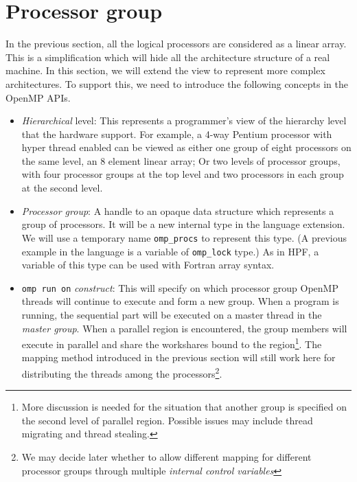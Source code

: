 
\section{Processor group}

In the previous section, all the logical processors are considered as a linear
array. This is a simplification which will hide all the architecture
structure of a real machine. In this section, we will extend the view to
represent more complex architectures. To support this, we need to introduce the
following concepts in the OpenMP APIs.

\begin{itemize}

  \item \emph{Hierarchical} level: This represents a programmer's view of the
    hierarchy level that the hardware support. For example, a 4-way Pentium
    processor with hyper thread enabled can be viewed as either one group of
    eight processors on the same level, an 8 element linear array; Or two
    levels of processor groups, with four processor groups at the top level and
    two processors in each group at the second level.

  \item \emph{Processor group}: A handle to an opaque data structure which
    represents a group of processors. It will be a new internal type in the
    language extension. We will use a temporary name \texttt{omp\_procs}
    to represent this type. (A previous example in the language is a variable of
    \texttt{omp\_lock} type.) As in HPF\cite{Koe93}, a variable of this
    type can be used with Fortran array syntax.

  \item \texttt{omp run on} \emph{construct}: This will specify on which
    processor group OpenMP threads will continue to execute and form a new
    group. When a program is running, the sequential part will be executed on
    a master thread in the \emph{master group}.  When a parallel region is
    encountered, the group members will execute in parallel and share the
    workshares bound to the region\footnote{More discussion is needed for the
    situation that another group is specified on the second level of parallel
    region. Possible issues may include thread migrating and thread stealing.}.
    The mapping method introduced in the previous section will still work here
    for distributing the threads among the processors\footnote{We may decide later
    whether to allow different mapping for different processor groups through
    multiple \emph{internal control variables}}.

\end{itemize}

